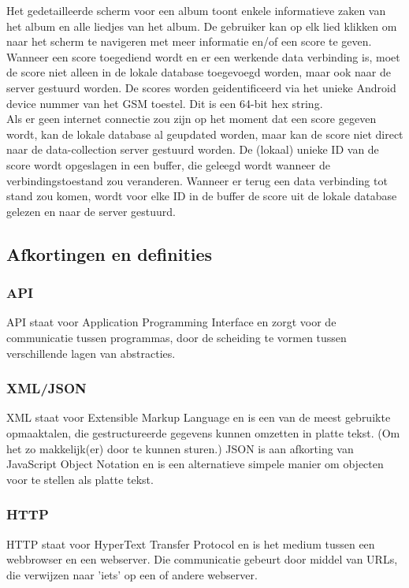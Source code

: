 \documentclass[11pt,a4paper]{article}
\begin{document}
Het gedetailleerde scherm voor een album toont enkele informatieve zaken van het album en alle liedjes van het album. De gebruiker kan op elk lied klikken om naar het scherm te navigeren met meer informatie en/of een score te geven. 
\\ 
	
Wanneer een score toegediend wordt en er een werkende data verbinding is, moet de score niet alleen in de lokale database toegevoegd worden, maar ook naar de server gestuurd worden. De scores worden geidentificeerd via het unieke Android device nummer van het GSM toestel. Dit is een 64-bit hex string. 
\\

Als er geen internet connectie zou zijn op het moment dat een score gegeven wordt, kan de lokale database al geupdated worden, maar kan de score niet direct naar de data-collection server gestuurd worden. De (lokaal) unieke ID van de score wordt opgeslagen in een buffer, die geleegd wordt wanneer de verbindingstoestand zou veranderen. Wanneer er terug een data verbinding tot stand zou komen, wordt voor elke ID in de buffer de score uit de lokale database gelezen en naar de server gestuurd.
	
	\subsection{Afkortingen en definities}
		\subsubsection{API}
		API staat voor Application Programming Interface en zorgt voor de communicatie tussen programmas, door de scheiding te vormen tussen verschillende lagen van abstracties.
		\subsubsection{XML/JSON}
		XML staat voor Extensible Markup Language en is een van de meest gebruikte opmaaktalen, die gestructureerde gegevens kunnen omzetten in platte tekst. (Om het zo makkelijk(er) door te kunnen sturen.)
		\newline
		JSON is aan afkorting van JavaScript Object Notation en is een alternatieve simpele manier om objecten voor te stellen als platte tekst.
		\subsubsection{HTTP}
		HTTP staat voor HyperText Transfer Protocol en is het medium tussen een webbrowser en een webserver. Die communicatie gebeurt door middel van URLs, die verwijzen naar 'iets' op een of andere webserver.
\end{document}
